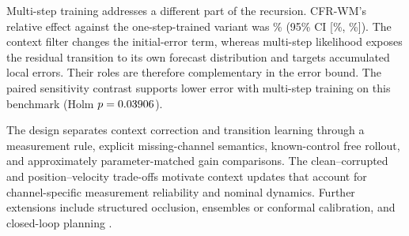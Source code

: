 Multi-step training addresses a different part of the recursion. CFR-WM's
relative effect against the one-step-trained variant was
\OneStepImprovement\% (95\% CI [\OneStepRelativeCILow\%,
\OneStepRelativeCIHigh\%]). The context filter changes the initial-error term,
whereas multi-step likelihood exposes the residual transition to its own
forecast distribution and targets accumulated local errors. Their roles are
therefore complementary in the error bound. The paired sensitivity contrast
supports lower error with multi-step training on this benchmark
(Holm $p=0.03906$).

The design separates context correction and transition learning through a
measurement rule, explicit missing-channel semantics, known-control free
rollout, and approximately parameter-matched gain comparisons. The clean--corrupted
and position--velocity trade-offs motivate context updates that account for
channel-specific measurement reliability and nominal dynamics. Further extensions
include structured occlusion, ensembles or conformal calibration, and
closed-loop planning
\cite{portela2025_conformal_prediction_for_uncertainty_quantification,brunke2022_safe_learning_in_robotics_from}.
